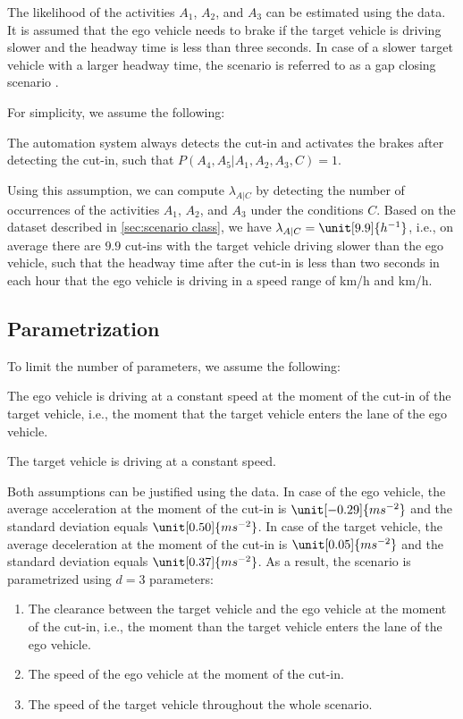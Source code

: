 The likelihood of the activities $A_1$, $A_2$, and $A_3$ can be estimated using the data. It is assumed that the ego vehicle needs to brake if the target vehicle is driving slower and the headway time is less than three seconds. In case of a slower target vehicle with a larger headway time, the scenario is referred to as a gap closing scenario \cite{semsarkazerooni2016cacc, gelder2016pacc}.

For simplicity, we assume the following:
\begin{assumption}
	The automation system always detects the cut-in and activates the brakes after detecting the cut-in, such that $P(A_4,A_5|A_1,A_2,A_3,C) = 1$.
\end{assumption}

Using this assumption, we can compute $\lambda_{A|C}$ by detecting the number of occurrences of the activities $A_1$, $A_2$, and $A_3$ under the conditions $C$. Based on the dataset described in \cref{sec:scenario class}, we have $\lambda_{A|C}=\unit[9.9]{h^{-1}}$, i.e., on average there are $9.9$ cut-ins with the target vehicle driving slower than the ego vehicle, such that the headway time after the cut-in is less than two seconds in each hour that the ego vehicle is driving in a speed range of \unit[60]{km/h} and \unit[130]{km/h}.



\subsection{Parametrization}
\label{sec:example parametrization}

To limit the number of parameters, we assume the following:
\begin{assumption}
	The ego vehicle is driving at a constant speed at the moment of the cut-in of the target vehicle, i.e., the moment that the target vehicle enters the lane of the ego vehicle.
\end{assumption}
\begin{assumption}
	The target vehicle is driving at a constant speed.
\end{assumption}
Both assumptions can be justified using the data. In case of the ego vehicle, the average acceleration at the moment of the cut-in is $\unit[-0.29]{ms^{-2}}$ and the standard deviation equals $\unit[0.50]{ms^{-2}}$. In case of the target vehicle, the average deceleration at the moment of the cut-in is $\unit[0.05]{ms^{-2}}$ and the standard deviation equals $\unit[0.37]{ms^{-2}}$. As a result, the scenario is parametrized using $d=3$ parameters:
\begin{enumerate}
	\item The clearance between the target vehicle and the ego vehicle at the moment of the cut-in, i.e., the moment than the target vehicle enters the lane of the ego vehicle.
	\item The speed of the ego vehicle at the moment of the cut-in.
	\item The speed of the target vehicle throughout the whole scenario.
\end{enumerate}


